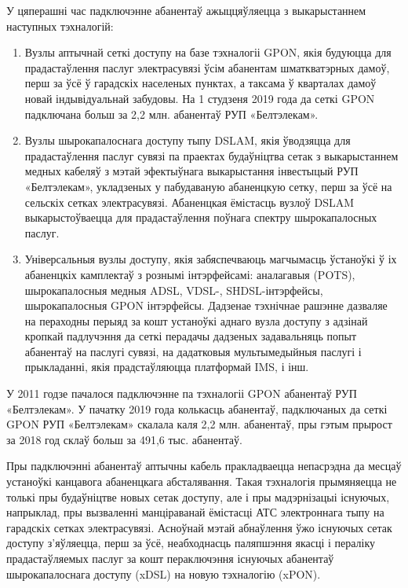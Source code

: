 У цяперашні час падключэнне абанентаў ажыццяўляецца з выкарыстаннем наступных тэхналогій:
\begin{enumerate}
    \item Вузлы аптычнай сеткі доступу на базе тэхналогіі GPON, якія будуюцца для прадастаўлення паслуг электрасувязі ўсім абанентам шматкватэрных дамоў, перш за ўсё ў гарадскіх населеных пунктах, а таксама ў кварталах дамоў новай індывідуальнай забудовы. На 1 студзеня 2019 года да сеткі GPON падключана больш за 2,2 млн. абанентаў РУП «Белтэлекам».
    \item Вузлы шырокапалоснага доступу тыпу DSLAM, якія ўводзяцца для прадастаўлення паслуг сувязі па праектах будаўніцтва сетак з выкарыстаннем медных кабеляў з мэтай эфектыўнага выкарыстання інвестыцый РУП «Белтэлекам», укладзеных у пабудаваную абаненцкую сетку, перш за ўсё на сельскіх сетках электрасувязі. Абаненцкая ёмістасць вузлоў DSLAM выкарыстоўваецца для прадастаўлення поўнага спектру шырокапалосных паслуг.
    \item Універсальныя вузлы доступу, якія забяспечваюць магчымасць ўстаноўкі ў іх абаненцкіх камплектаў з рознымі інтэрфейсамі: аналагавыя (POTS), шырокапалосныя медныя ADSL, VDSL-, SHDSL-інтэрфейсы, шырокапалосныя GPON інтэрфейсы. Дадзенае тэхнічнае рашэнне дазваляе на пераходны перыяд за кошт устаноўкі аднаго вузла доступу з адзінай кропкай падлучэння да сеткі перадачы дадзеных задавальняць попыт абанентаў на паслугі сувязі, на дадатковыя мультымедыйныя паслугі і прыкладанні, якія прадстаўляюцца платформай IMS, і інш.
\end{enumerate}

У 2011 годзе пачалося падключэнне па тэхналогіі GPON абанентаў РУП «Белтэлекам».  У пачатку 2019 года колькасць абанентаў, падключаных да сеткі GPON РУП «Белтэлекам» скалала  каля 2,2 млн. абанентаў, пры гэтым прырост за 2018 год склаў больш за 491,6 тыс. абанентаў.

Пры падключэнні абанентаў аптычны кабель пракладваецца непасрэдна да месцаў устаноўкі канцавога абаненцкага абсталявання. Такая тэхналогія прымяняецца не толькі пры будаўніцтве новых сетак доступу, але і пры мадэрнізацыі існуючых, напрыклад, пры вызваленні манціраванай ёмістасці АТС электроннага тыпу на гарадскіх сетках электрасувязі. Асноўнай мэтай абнаўлення ўжо існуючых сетак доступу з'яўляецца, перш за ўсё, неабходнасць паляпшэння якасці і пераліку прадастаўляемых паслуг за кошт пераключэння існуючых абанентаў шырокапалоснага доступу (xDSL) на новую тэхналогію (xPON).

